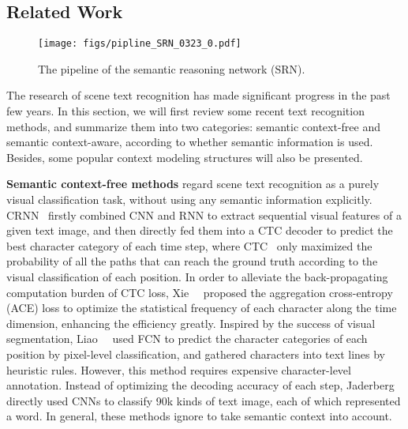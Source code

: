 \documentclass[10pt,twocolumn,letterpaper]{article}
\begin{document}
\begin{CJK}{UTF8}{gbsn}
\section{Related Work}
\begin{figure*}[htp]\begin{center}
\texttt{[image: figs/pipline\_SRN\_0323\_0.pdf]}
  \vspace{-3mm}
  \end{center}
      \caption{The pipeline of the semantic reasoning network (SRN). 
      }
  \label{fig:pipeline}
\vspace{-3mm}
  \end{figure*}
The research of scene text recognition has made significant progress in the past few years. 
In this section, we will first review some recent text recognition methods, and summarize them into two categories: semantic context-free and semantic context-aware, according to whether semantic information is used. Besides, some popular context modeling structures will also be presented.

\textbf{Semantic context-free methods} regard scene text recognition as a purely visual classification task, without using any semantic information explicitly. CRNN~\cite{crnn-shi2016end} firstly combined CNN and RNN to extract sequential visual features of a given text image, and then directly fed them into a CTC decoder to predict the best character category of each time step, where CTC~\cite{graves2006CTC} only maximized the probability of all the paths that can reach the ground truth according to the visual classification of each position.
In order to alleviate the back-propagating computation burden of CTC loss, Xie~\etal~\cite{xie2019aggregation} proposed the aggregation cross-entropy (ACE) loss to optimize the statistical frequency of each character along the time dimension, enhancing the efficiency greatly.
Inspired by the success of visual segmentation, Liao~\etal~\cite{liao2019scene-fcn} used FCN to predict the character categories of each position by pixel-level classification, and gathered characters into text lines by heuristic rules. However, this method requires expensive character-level annotation. Instead of optimizing the decoding accuracy of each step, Jaderberg~\cite{synth90k-1-Jaderberg14c} directly used CNNs to classify 90k kinds of text image, each of which represented a word.
In general, these methods ignore to take semantic context into account.


\end{CJK}
\end{document}
